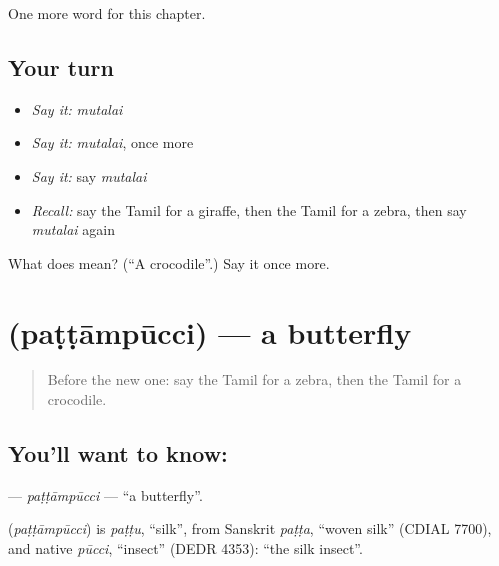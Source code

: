\begin{grammarlens}[title={What you've built}]
One more word for this chapter.
\end{grammarlens}

\subsection*{Your turn}
\begin{itemize}
\raggedright
  \item \emph{Say it:} \emph{mutalai}
  \item \emph{Say it:} \emph{mutalai}, once more
  \item \emph{Say it:} say \emph{mutalai}
  \item \emph{Recall:} say the Tamil for a giraffe, then the Tamil for a zebra, then say \emph{mutalai} again
\end{itemize}

\begin{tcolorbox}[breakable,colback=teal!4,colframe=teal!35!black,title={Before you move on}]
What does  mean? (\textquotedblleft{}A crocodile\textquotedblright{}.) Say it once more.
\end{tcolorbox}
\section[\texorpdfstring{\ta{பட்டாம்பூச்சி} (paṭṭāmpūcci)}{பட்டாம்பூச்சி (paṭṭāmpūcci)}]{ (paṭṭāmpūcci) — a butterfly}

\label{lesson:TA-C218-pattampucci}



\begin{quote}
Before the new one: say the Tamil for a zebra, then the Tamil for a crocodile.
\end{quote}

\subsection*{You'll want to know: }
\textbf{} — \emph{paṭṭāmpūcci} — \textquotedblleft{}a butterfly\textquotedblright{}.

\begin{cousinweb}
\textbf{} (\emph{paṭṭāmpūcci}) is \emph{paṭṭu}, \textquotedblleft{}silk\textquotedblright{}, from Sanskrit \emph{paṭṭa}, \textquotedblleft{}woven silk\textquotedblright{} (CDIAL 7700), and native \emph{pūcci}, \textquotedblleft{}insect\textquotedblright{} (DEDR 4353): \textquotedblleft{}the silk insect\textquotedblright{}.
\end{cousinweb}

